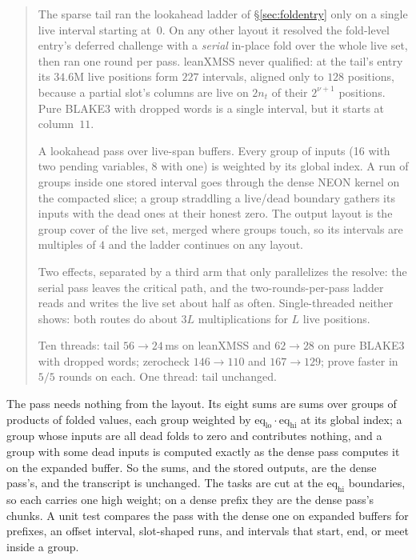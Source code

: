 \documentclass[11pt]{article}
\newcommand{\eq}{\mathrm{eq}}
\newenvironment{optsummary}{%
  \begin{quote}\small
  \begin{description}
  \setlength{\itemsep}{1pt}\setlength{\parsep}{0pt}\setlength{\topsep}{2pt}
}{%
  \end{description}
  \end{quote}
}
\begin{document}
\begin{optsummary}
\item[Baseline:] The sparse tail ran the lookahead ladder of \S\ref{sec:foldentry} only on a single live interval starting at~$0$. On any other layout it resolved the fold-level entry's deferred challenge with a \emph{serial} in-place fold over the whole live set, then ran one round per pass. leanXMSS never qualified: at the tail's entry its $34.6$M live positions form $227$ intervals, aligned only to $128$ positions, because a partial slot's columns are live on $2n_t$ of their $2^{\nu+1}$ positions. Pure BLAKE3 with dropped words is a single interval, but it starts at column~$11$.
\item[Improvement:] A lookahead pass over live-span buffers. Every group of inputs (16 with two pending variables, 8 with one) is weighted by its global index. A run of groups inside one stored interval goes through the dense NEON kernel on the compacted slice; a group straddling a live/dead boundary gathers its inputs with the dead ones at their honest zero. The output layout is the group cover of the live set, merged where groups touch, so its intervals are multiples of $4$ and the ladder continues on any layout.
\item[Mechanism:] Two effects, separated by a third arm that only parallelizes the resolve: the serial pass leaves the critical path, and the two-rounds-per-pass ladder reads and writes the live set about half as often. Single-threaded neither shows: both routes do about $3L$ multiplications for $L$ live positions.
\item[Result:] Ten threads: tail $56\to24\,$ms on leanXMSS and $62\to28$ on pure BLAKE3 with dropped words; zerocheck $146\to110$ and $167\to129$; prove faster in $5/5$ rounds on each. One thread: tail unchanged.
\end{optsummary}

The pass needs nothing from the layout. Its eight sums are sums over
groups of products of folded values, each group weighted by
$\eq_{\mathrm{lo}}\cdot\eq_{\mathrm{hi}}$ at its global index; a group
whose inputs are all dead folds to zero and contributes nothing, and a
group with some dead inputs is computed exactly as the dense pass computes
it on the expanded buffer. So the sums, and the stored outputs, are the
dense pass's, and the transcript is unchanged. The tasks are cut at the
$\eq_{\mathrm{hi}}$ boundaries, so each carries one high weight; on a
dense prefix they are the dense pass's chunks. A unit test compares the
pass with the dense one on expanded buffers for prefixes, an offset
interval, slot-shaped runs, and intervals that start, end, or meet inside
a group.
\end{document}
